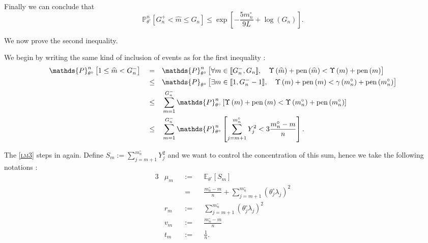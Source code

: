 Finally we can conclude that
\[\mathds{P}_{\theta^{\circ}}^{n}\left[G_{n}^{+} < \widehat{m} \leq G_{n}\right] \leq \exp\left[- \frac{5 m_{n}^{\circ}}{9 L} + \log\left(G_{n}\right)\right].\]

\bigskip

We now prove the second inequality.

We begin by writing the same kind of inclusion of events as for the first inequality :
\begin{alignat*}{3}
& \mathds{P}_{\theta^{\circ}}^{n} \left[1 \leq \widehat{m} < G_{n}^{-}\right] &&=&& \mathds{P}_{\theta^{\circ}}^{n} \left[ \forall m \in \llbracket G_{n}^{-}, G_{n} \rrbracket, \quad \Upsilon\left(\widehat{m}\right) + \pen\left(\widehat{m}\right) < \Upsilon\left(m\right) + \pen\left(m\right)\right]\\
& &&\leq&& \mathds{P}_{\theta^{\circ}} \left[ \exists m \in \llbracket 1, G_{n}^{-} -1 \rrbracket, \quad \Upsilon\left(m\right) + \pen\left(m\right) < \gamma\left(m_{n}^{\circ}\right) + \pen\left(m_{n}^{\circ}\right)\right]\\
& &&\leq&& \sum\limits_{m = 1}^{G_{n}^{-}} \mathds{P}_{\theta^{\circ}}^{n} \left[\Upsilon\left(m\right) + \pen\left(m\right) < \Upsilon\left(m_{n}^{\circ}\right) + \pen\left(m_{n}^{\circ}\right)\right]\\
& &&\leq&& \sum\limits_{m = 1}^{G_{n}^{-}} \mathds{P}_{\theta^{\circ}}^{n} \left[\sum\limits_{j = m + 1}^{m_{n}^{\circ}} Y_{j}^{2} < 3 \frac{m_{n}^{\circ} - m}{n} \right].
\end{alignat*}

The \textsc{\cref{lm3}} steps in again.
Define $S_{m} := \sum\limits_{j = m + 1}^{m_{n}^{\circ}} Y_{j}^{2}$ and we want to control the concentration of this sum, hence we take the following notations :
\begin{alignat*}{3}
& \mu_{m} &&:=&& \mathds{E}_{\theta^{\circ}}\left[S_{m}\right]\\
& &&=&& \frac{m_{n}^{\circ} - m}{n} + \sum\limits_{j = m+1}^{m_{n}^{\circ}}\left(\theta^{\circ}_{j}\lambda_{j}\right)^{2}\\
&r_{m} &&:=&& \sum\limits_{j = m+1}^{m_{n}^{\circ}}\left(\theta^{\circ}_{j}\lambda_{j}\right)^{2}\\
&v_{m} &&:=&& \frac{m_{n}^{\circ} - m}{n}\\
&t_{m} &&:=&& \frac{1}{n}.
\end{alignat*}

